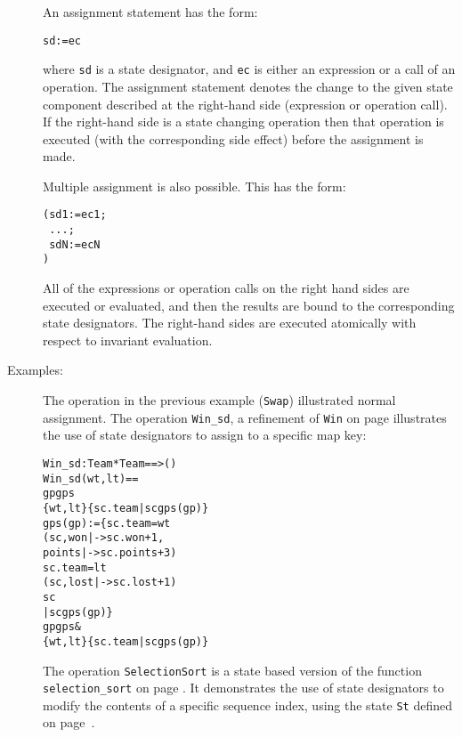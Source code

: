 \documentclass[\pformat,12pt]{article}
\begin{document}
\begin{description}
  An assignment statement has the form:
  \begin{alltt}
    sd := ec
  \end{alltt}
  where {\tt sd} is a state designator, and {\tt ec} is either an
  expression or a call of an operation. The assignment statement denotes the
  change to the given state component described at the right-hand side
  (expression or operation call). If the right-hand side is a state
  changing operation then that operation is executed (with the
  corresponding side effect) before the assignment is made.


  Multiple assignment is also possible. This has the form:
  \begin{alltt}
     (sd1 := ec1;
\           ...;
\           sdN := ecN
           )
  \end{alltt}
  All of the expressions or operation calls on the right hand sides are
  executed or evaluated, and then the results are bound to the
  corresponding state designators. The right-hand sides are executed
  atomically with respect to invariant evaluation. 

\item[Examples:] The operation in the previous example (\texttt{Swap}) 
  illustrated normal assignment. The operation \texttt{Win\_sd}, a 
  refinement of \texttt{Win} on page \pageref{winDef} illustrates the use of 
  state designators to assign to a specific map key:
  \begin{alltt}
  Win_sd : Team * Team ==> ()
  Win_sd (wt,lt) ==
     gp  gps  
        \{wt,lt\}  \{sc.team | sc  gps(gp)\}
     gps(gp) := \{  sc.team = wt
                   (sc, won |-> sc.won + 1,
                               points |-> sc.points + 3)
                    sc.team = lt
                   (sc, lost |-> sc.lost + 1)
                    sc 
                 | sc  gps(gp)\}
    gp  gps & 
                 \{wt,lt\}  \{sc.team | sc  gps(gp)\}
  \end{alltt}
  The operation \texttt{SelectionSort} is a state based version of the 
  function \texttt{selection\_sort} on page \pageref{selectionSortdef}. It 
  demonstrates the use of state designators to modify the contents of a 
  specific sequence index, using the 
state \texttt{St}
 defined on page~\pageref{stdef}. 
  \begin{alltt}
 

\end{alltt}
\end{description}
\end{document}
